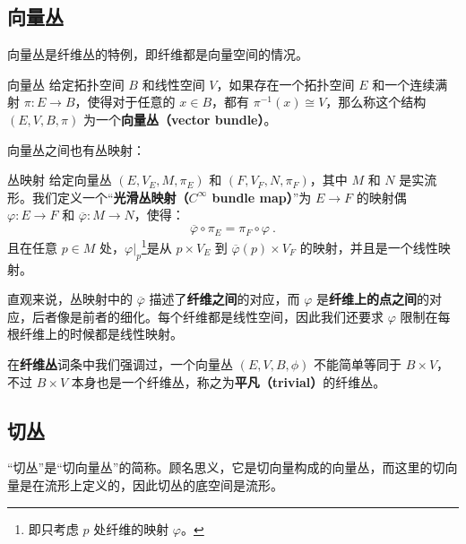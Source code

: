 \begin{issues}
\issueDraft
\end{issues}


\subsection{向量丛}


向量丛是纤维丛的特例，即纤维都是向量空间的情况。

\begin{definition}{向量丛}
给定拓扑空间 $B$ 和线性空间 $V$，如果存在一个拓扑空间 $E$ 和一个连续满射 $\pi:E\rightarrow B$，使得对于任意的 $x\in B$，都有 $\pi^{-1}(x)\cong V$，那么称这个结构 $(E, V, B, \pi)$ 为一个\textbf{向量丛（vector bundle）}。
\end{definition}

向量丛之间也有丛映射：

\begin{definition}{丛映射}
给定向量丛 $(E, V_E, M, \pi_E)$ 和 $(F, V_F, N, \pi_F)$，其中 $M$ 和 $N$ 是实流形。我们定义一个“\textbf{光滑丛映射（$C^\infty$ bundle map）}”为 $E\rightarrow F$ 的映射偶 $\varphi: E\rightarrow F$ 和 $\overline{\varphi}: M\rightarrow N$，使得：
\begin{equation}
\overline{\varphi}\circ\pi_E=\pi_F\circ\varphi~.
\end{equation}
且在任意 $p\in M$ 处，$\varphi|_p$\footnote{即只考虑 $p$ 处纤维的映射 $\varphi$。}是从 $p\times V_E$ 到 $\overline{\varphi}(p)\times V_F$ 的映射，并且是一个线性映射。
\end{definition}

直观来说，丛映射中的 $\overline{\varphi}$ 描述了\textbf{纤维之间}的对应，而 $\varphi$ 是\textbf{纤维上的点之间}的对应，后者像是前者的细化。每个纤维都是线性空间，因此我们还要求 $\varphi$ 限制在每根纤维上的时候都是线性映射。

在\textbf{纤维丛}词条中我们强调过，一个向量丛 $(E, V, B, \phi)$ 不能简单等同于 $B\times V$，不过 $B\times V$ 本身也是一个纤维丛，称之为\textbf{平凡（trivial）}的纤维丛。




\subsection{切丛}
“切丛”是“切向量丛”的简称。顾名思义，它是切向量构成的向量丛，而这里的切向量是在流形上定义的，因此切丛的底空间是流形。

